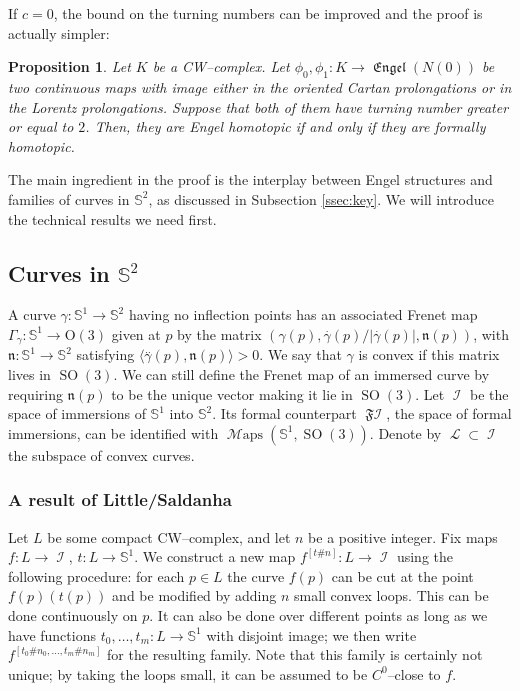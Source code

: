 \documentclass[10pt]{amsart}
\newcommand{\SO}{\operatorname{SO}}
\newcommand{\Maps}{\operatorname{\mathcal{M}aps}}
\newcommand{\Engel}{\operatorname{\mathfrak{Engel}}}
\newcommand{\SL}{\operatorname{\mathcal{L}}}
\newcommand{\Imm}{\operatorname{\mathcal{I}}}
\newcommand{\FImm}{\operatorname{\mathfrak{F}\mathcal{I}}}
\newcommand{\NS}{{\mathbb{S}}}
\newtheorem{proposition}{Proposition}
\theoremstyle{definition}
\begin{document}
If $c=0$, the bound on the turning numbers can be improved and the proof is actually simpler:
\begin{proposition} \label{prop:main}
Let $K$ be a CW--complex. Let $\phi_0,\phi_1: K \to \Engel(N(0))$ be two continuous maps with image either in the oriented Cartan prolongations or in the Lorentz prolongations. Suppose that both of them have turning number greater or equal to $2$. Then, they are Engel homotopic if and only if they are formally homotopic.
\end{proposition}

The main ingredient in the proof is the interplay between Engel structures and families of curves in $\NS^2$, as discussed in Subsection \ref{ssec:key}. We will introduce the technical results we need first.

\subsection{Curves in $\NS^2$} \label{ssec:curves}

A curve $\gamma: \NS^1 \to \NS^2$ having no inflection points has an associated Frenet map $\Gamma_\gamma: \NS^1 \to \text{O}(3)$ given at $p$ by the matrix $(\gamma(p), \overset{.}{\gamma}(p)/|\overset{.}{\gamma}(p)|, \mathfrak{n}(p))$, with $\mathfrak{n}: \NS^1 \to \NS^2$ satisfying $\langle\overset{..}{\gamma}(p), \mathfrak{n}(p)\rangle > 0$. We say that $\gamma$ is convex if this matrix lives in $\SO(3)$. We can still define the Frenet map of an immersed curve by requiring $\mathfrak{n}(p)$ to be the unique vector making it lie in $\SO(3)$. Let $\Imm$ be the space of immersions of $\NS^1$ into $\NS^2$. Its formal counterpart $\FImm$, the space of formal immersions, can be identified with $\Maps(\NS^1, \SO(3))$. Denote by $\SL \subset \Imm$ the subspace of convex curves. 

\subsubsection{A result of Little/Saldanha} \label{sssec:Little}

Let $L$ be some compact CW--complex, and let $n$ be a positive integer. Fix maps $f: L \to \Imm$, $t: L \to \NS^1$. We construct a new map $f^{[t\# n]}: L \to \Imm$ using the following procedure: for each $p \in L$ the curve $f(p)$ can be cut at the point $f(p)(t(p))$ and be modified by adding $n$ small convex loops. This can be done continuously on $p$. It can also be done over different points as long as we have functions $t_0,\dots,t_m: L \to \NS^1$ with disjoint image; we then write $f^{[t_0\#n_0,\dots,t_m\#n_m]}$ for the resulting family. Note that this family is certainly not unique; by taking the loops small, it can be assumed to be $C^0$--close to $f$.
\end{document}
